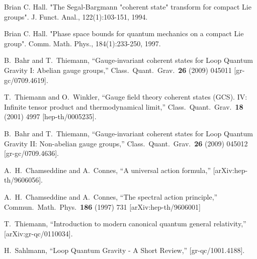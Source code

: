 \documentclass[12pt]{article}
\begin{document}
\begin{thebibliography}{99}
Brian C. Hall. "The Segal-Bargmann "coherent state" transform for compact Lie groups". J. Funct. Anal., 122(1):103-151, 1994.

Brian C. Hall. "Phase space bounds for quantum mechanics on a compact Lie group". Comm. Math. Phys., 184(1):233-250, 1997.



  B.~Bahr and T.~Thiemann,
  ``Gauge-invariant coherent states for Loop Quantum Gravity I: Abelian gauge
  groups,''
  Class.\ Quant.\ Grav.\  {\bf 26} (2009) 045011
  [gr-gc/0709.4619].







  T.~Thiemann and O.~Winkler,
  ``Gauge field theory coherent states (GCS). IV: Infinite tensor product  and
  thermodynamical limit,''
  Class.\ Quant.\ Grav.\  {\bf 18} (2001) 4997
  [hep-th/0005235].


  B.~Bahr and T.~Thiemann,
  ``Gauge-invariant coherent states for Loop Quantum Gravity II: Non-abelian
  gauge groups,''
  Class.\ Quant.\ Grav.\  {\bf 26} (2009) 045012
  [gr-gc/0709.4636].







A.~H.~Chamseddine and A.~Connes,
``A universal action formula,''
[arXiv:hep-th/9606056].

A.~H.~Chamseddine and A.~Connes,
``The spectral action principle,''
Commun.\ Math.\ Phys.\ {\bf 186} (1997) 731
[arXiv:hep-th/9606001]






  T.~Thiemann,
  ``Introduction to modern canonical quantum general relativity,''
  [arXiv:gr-qc/0110034].




  H.~Sahlmann,
  ``Loop Quantum Gravity - A Short Review,''
  [gr-qc/1001.4188].






\end{thebibliography}
\end{document}
